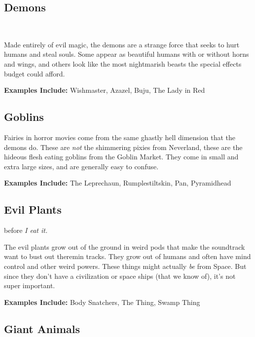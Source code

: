 \subsection{Demons} 
\

Made entirely of evil magic, the demons are a strange force that seeks to hurt humans and steal souls. Some appear as beautiful humans with or without horns and wings, and others look like the most nightmarish beasts the special effects budget could afford.

\textbf{Examples Include:} Wishmaster, Azazel, Buju, The Lady in Red

\subsection{Goblins} 

Fairies in horror movies come from the same ghastly hell dimension that the demons do. These are \textit{not} the shimmering pixies from Neverland, these are the hideous flesh eating goblins from the Goblin Market. They come in small and extra large sizes, and are generally easy to confuse.

\textbf{Examples Include:} The Leprechaun, Rumplestiltskin, Pan, Pyramidhead

\subsection{Evil Plants} 
before\textit{ I eat it.}

The evil plants grow out of the ground in weird pods that make the soundtrack want to bust out theremin tracks.  They grow out of humans and often have mind control and other weird powers. These things might actually \textit{be} from Space. But since they don't have a civilization or space ships (that we know of), it's not super important.

\textbf{Examples Include:} Body Snatchers, The Thing, Swamp Thing

\subsection{Giant Animals} 

